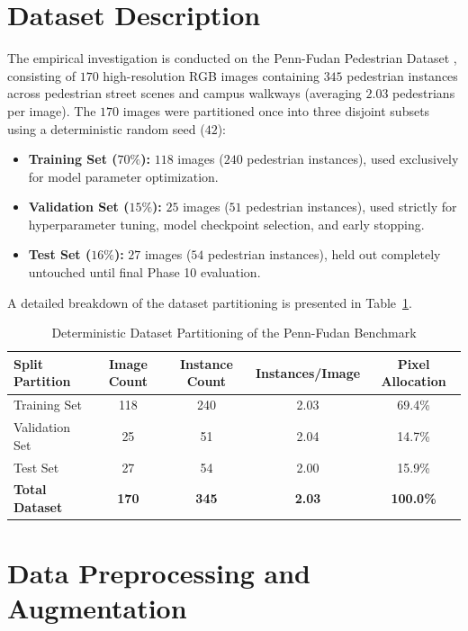 \documentclass[10pt,a4paper]{report}
\begin{document}
\section{Dataset Description}
The empirical investigation is conducted on the Penn-Fudan Pedestrian Dataset \cite{wang2007pennfudan}, consisting of $170$ high-resolution RGB images containing $345$ pedestrian instances across pedestrian street scenes and campus walkways (averaging $2.03$ pedestrians per image). The $170$ images were partitioned once into three disjoint subsets using a deterministic random seed ($42$):
\begin{itemize}
    \item \textbf{Training Set ($70\%$):} $118$ images ($240$ pedestrian instances), used exclusively for model parameter optimization.
    \item \textbf{Validation Set ($15\%$):} $25$ images ($51$ pedestrian instances), used strictly for hyperparameter tuning, model checkpoint selection, and early stopping.
    \item \textbf{Test Set ($16\%$):} $27$ images ($54$ pedestrian instances), held out completely untouched until final Phase 10 evaluation.
\end{itemize}

A detailed breakdown of the dataset partitioning is presented in Table~\ref{tab:dataset_splits}.

\begin{table}[htbp]
\centering
\small
\caption{Deterministic Dataset Partitioning of the Penn-Fudan Benchmark}
\label{tab:dataset_splits}
\begin{tabular}{lcccc}
\toprule
\textbf{Split Partition} & \textbf{Image Count} & \textbf{Instance Count} & \textbf{Instances/Image} & \textbf{Pixel Allocation} \\
\midrule
Training Set & 118 & 240 & 2.03 & 69.4\% \\
Validation Set & 25 & 51 & 2.04 & 14.7\% \\
Test Set & 27 & 54 & 2.00 & 15.9\% \\
\midrule
\textbf{Total Dataset} & \textbf{170} & \textbf{345} & \textbf{2.03} & \textbf{100.0\%} \\
\bottomrule
\end{tabular}
\end{table}

\section{Data Preprocessing and Augmentation}
\end{document}
